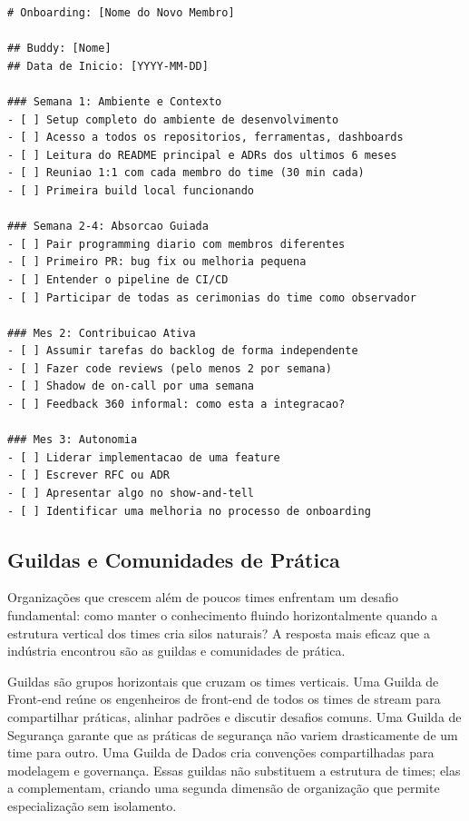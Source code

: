 \begin{lstlisting}[language={}, caption={Template de Plano de Onboarding}]
# Onboarding: [Nome do Novo Membro]

## Buddy: [Nome]
## Data de Inicio: [YYYY-MM-DD]

### Semana 1: Ambiente e Contexto
- [ ] Setup completo do ambiente de desenvolvimento
- [ ] Acesso a todos os repositorios, ferramentas, dashboards
- [ ] Leitura do README principal e ADRs dos ultimos 6 meses
- [ ] Reuniao 1:1 com cada membro do time (30 min cada)
- [ ] Primeira build local funcionando

### Semana 2-4: Absorcao Guiada
- [ ] Pair programming diario com membros diferentes
- [ ] Primeiro PR: bug fix ou melhoria pequena
- [ ] Entender o pipeline de CI/CD
- [ ] Participar de todas as cerimonias do time como observador

### Mes 2: Contribuicao Ativa
- [ ] Assumir tarefas do backlog de forma independente
- [ ] Fazer code reviews (pelo menos 2 por semana)
- [ ] Shadow de on-call por uma semana
- [ ] Feedback 360 informal: como esta a integracao?

### Mes 3: Autonomia
- [ ] Liderar implementacao de uma feature
- [ ] Escrever RFC ou ADR
- [ ] Apresentar algo no show-and-tell
- [ ] Identificar uma melhoria no processo de onboarding
\end{lstlisting}

\subsection{Guildas e Comunidades de Prática}

Organizações que crescem além de poucos times enfrentam um desafio
fundamental: como manter o conhecimento fluindo horizontalmente quando a
estrutura vertical dos times cria silos naturais? A resposta mais eficaz que
a indústria encontrou são as guildas e comunidades de prática.

Guildas são grupos horizontais que cruzam os times verticais. Uma Guilda de
Front-end reúne os engenheiros de front-end de todos os times de stream para
compartilhar práticas, alinhar padrões e discutir desafios comuns. Uma
Guilda de Segurança garante que as práticas de segurança não variem
drasticamente de um time para outro. Uma Guilda de Dados cria convenções
compartilhadas para modelagem e governança. Essas guildas não substituem a
estrutura de times; elas a complementam, criando uma segunda dimensão de
organização que permite especialização sem isolamento.


